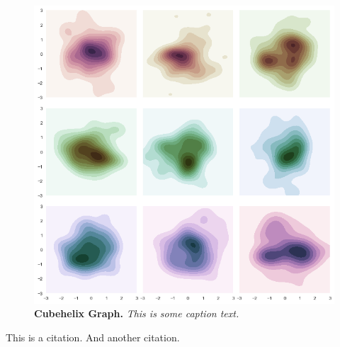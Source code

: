 \documentclass[12pt]{article}
\begin{document}
\begin{figure}[!ht]
	\centering
	\begin{minipage}{10cm}
	\includegraphics[width=\linewidth]{cubehelixpalette}
	\caption[Figure \thefigure. Cubehelix Graph]{ \textbf{Cubehelix Graph.} \textit{This is some caption text.}}
	\label{fig:cubehelix}
	\end{minipage}
\end{figure}

This is a citation\cite[chapter, p.~15]{greenwade93}.
And another citation\cite{goossens93}.
\end{document}
